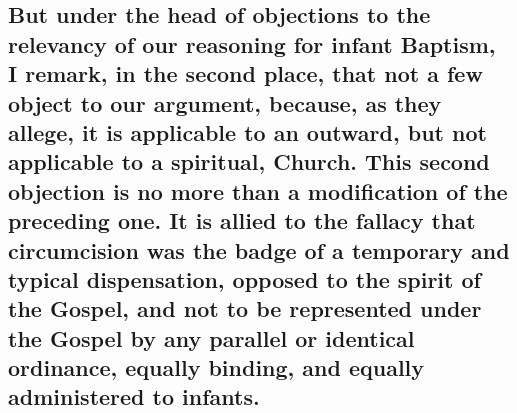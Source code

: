 \documentclass[english,]{book}
\begin{document}
\hypertarget{but-under-the-head-of-objections-to-the-relevancy-of-our-reasoning-for-infant-baptism-i-remark-in-the-second-place-that-not-a-few-object-to-our-argument-because-as-they-allege-it-is-applicable-to-an-outward-but-not-applicable-to-a-spiritual-church.-this-second-objection-is-no-more-than-a-modification-of-the-preceding-one.-it-is-allied-to-the-fallacy-that-circumcision-was-the-badge-of-a-temporary-and-typical-dispensation-opposed-to-the-spirit-of-the-gospel-and-not-to-be-represented-under-the-gospel-by-any-parallel-or-identical-ordinance-equally-binding-and-equally-administered-to-infants.}{%
\subsection{But under the head of objections to the relevancy of our reasoning for infant Baptism, I remark, in the second place, that not a few object to our argument, because, as they allege, it is applicable to an outward, but not applicable to a spiritual, Church. This second objection is no more than a modification of the preceding one. It is allied to the fallacy that circumcision was the badge of a temporary and typical dispensation, opposed to the spirit of the Gospel, and not to be represented under the Gospel by any parallel or identical ordinance, equally binding, and equally administered to infants.}\label{but-under-the-head-of-objections-to-the-relevancy-of-our-reasoning-for-infant-baptism-i-remark-in-the-second-place-that-not-a-few-object-to-our-argument-because-as-they-allege-it-is-applicable-to-an-outward-but-not-applicable-to-a-spiritual-church.-this-second-objection-is-no-more-than-a-modification-of-the-preceding-one.-it-is-allied-to-the-fallacy-that-circumcision-was-the-badge-of-a-temporary-and-typical-dispensation-opposed-to-the-spirit-of-the-gospel-and-not-to-be-represented-under-the-gospel-by-any-parallel-or-identical-ordinance-equally-binding-and-equally-administered-to-infants.}}
\end{document}
